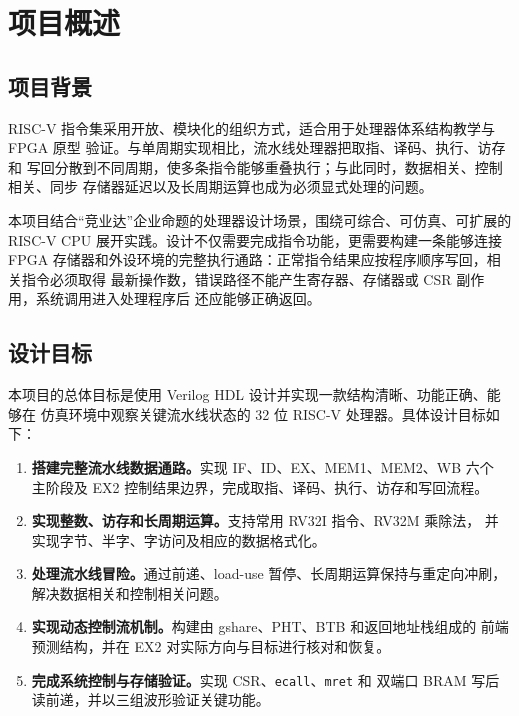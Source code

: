 \documentclass[UTF8,zihao=-4,a4paper]{ctexart}
\numberwithin{table}{section}
\numberwithin{figure}{section}
\newcommand{\code}[1]{\texttt{#1}}
\begin{document}
\section{项目概述}

\subsection{项目背景}

RISC-V 指令集采用开放、模块化的组织方式，适合用于处理器体系结构教学与 FPGA 原型
验证\cite{riscv-unpriv}。与单周期实现相比，流水线处理器把取指、译码、执行、访存和
写回分散到不同周期，使多条指令能够重叠执行；与此同时，数据相关、控制相关、同步
存储器延迟以及长周期运算也成为必须显式处理的问题。

本项目结合“竞业达”企业命题的处理器设计场景，围绕可综合、可仿真、可扩展的
RISC-V CPU 展开实践。设计不仅需要完成指令功能，更需要构建一条能够连接 FPGA
存储器和外设环境的完整执行通路：正常指令结果应按程序顺序写回，相关指令必须取得
最新操作数，错误路径不能产生寄存器、存储器或 CSR 副作用，系统调用进入处理程序后
还应能够正确返回。

\subsection{设计目标}

本项目的总体目标是使用 Verilog HDL 设计并实现一款结构清晰、功能正确、能够在
仿真环境中观察关键流水线状态的 32 位 RISC-V 处理器。具体设计目标如下：

\begin{enumerate}
  \item \textbf{搭建完整流水线数据通路。}实现 IF、ID、EX、MEM1、MEM2、WB 六个
        主阶段及 EX2 控制结果边界，完成取指、译码、执行、访存和写回流程。
  \item \textbf{实现整数、访存和长周期运算。}支持常用 RV32I 指令、RV32M 乘除法，
        并实现字节、半字、字访问及相应的数据格式化。
  \item \textbf{处理流水线冒险。}通过前递、load-use 暂停、长周期运算保持与重定向冲刷，
        解决数据相关和控制相关问题。
  \item \textbf{实现动态控制流机制。}构建由 gshare、PHT、BTB 和返回地址栈组成的
        前端预测结构，并在 EX2 对实际方向与目标进行核对和恢复。
  \item \textbf{完成系统控制与存储验证。}实现 CSR、\code{ecall}、\code{mret} 和
        双端口 BRAM 写后读前递，并以三组波形验证关键功能。
\end{enumerate}
\end{document}

